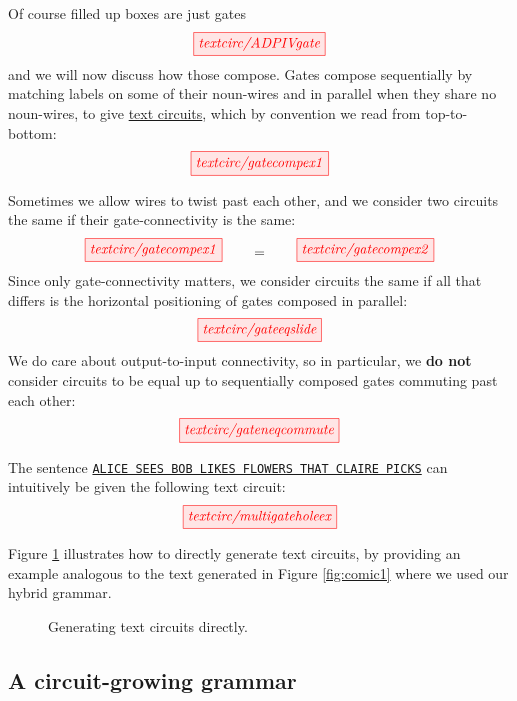 \begin{fullwidth}
Of course filled up boxes are just gates
\[
\tikzfig{textcirc/ADPIVgate}
\]
and we will now discuss how those compose. Gates compose sequentially by matching labels on some of their noun-wires and in parallel when they share no noun-wires,  to give \underline{text circuits}, which by convention we read from top-to-bottom:  
\[
\tikzfig{textcirc/gatecompex1}  
\]

\begin{convention}\label{conv:sliding}
Sometimes we allow wires to twist past each other, and we consider two circuits the same if their gate-connectivity is the same:
\[
\tikzfig{textcirc/gatecompex1} \quad\quad = \quad\quad \tikzfig{textcirc/gatecompex2}
\]
Since only gate-connectivity matters, we consider circuits the same if all that differs is the horizontal positioning of gates composed in parallel:
\[
\tikzfig{textcirc/gateeqslide} 
\]
We do care about output-to-input connectivity, so in particular, we {\bR\bf do not\e}
consider circuits to be equal up to sequentially composed gates commuting past each other:  
\[
\tikzfig{textcirc/gateneqcommute}  
\]
\end{convention}

\begin{example}  
The sentence \texttt{\underline{ALICE SEES BOB LIKES FLOWERS THAT CLAIRE PICKS}} can intuitively be given the following text circuit:
\[
\tikzfig{textcirc/multigateholeex}
\]
\end{example}

\begin{example}
Figure \ref{fig:circuitgen} illustrates how to directly generate text circuits, by providing an example analogous to the text generated in Figure \ref{fig:comic1} where we used our hybrid grammar.
\begin{figure}[h!]
    \centering
    \caption{Generating text circuits directly.}
    \label{fig:circuitgen}
\end{figure}
\end{example}

\subsection{A circuit-growing grammar}


\end{fullwidth}
